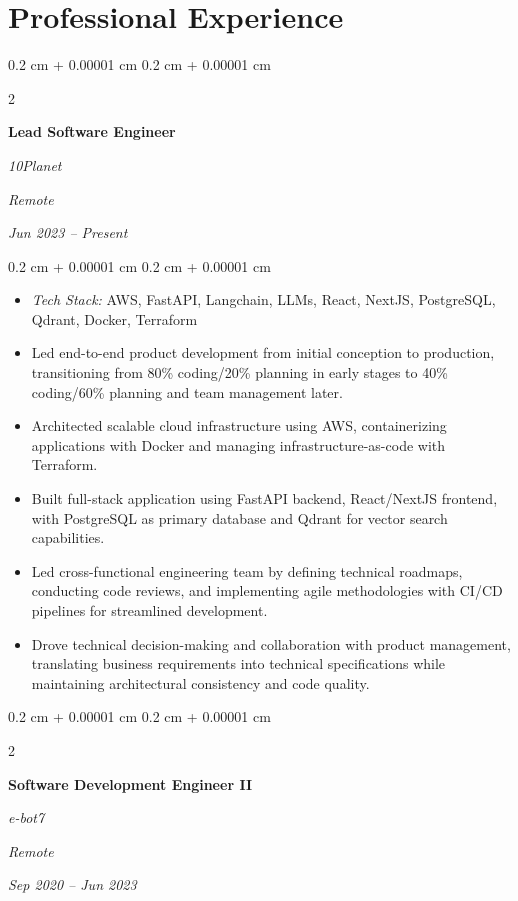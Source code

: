 \documentclass[10pt, letterpaper]{article}
\newenvironment{highlights}{
        \begin{itemize}[
            topsep=0.10 cm,
            parsep=0.10 cm,
            partopsep=0pt,
            itemsep=0pt,
            leftmargin=0.4 cm + 10pt
        ]
    }{
        \end{itemize}
    } %
\newenvironment{onecolentry}{
        \begin{adjustwidth}{
            0.2 cm + 0.00001 cm
        }{
            0.2 cm + 0.00001 cm
        }
    }{
        \end{adjustwidth}
    } %
\newenvironment{twocolentry}[2][]{
        \onecolentry
        \def\secondColumn{#2}
        \setcolumnwidth{\fill, 4.5 cm}
        \begin{paracol}{2}
    }{
        \switchcolumn \raggedleft \secondColumn
        \end{paracol}
        \endonecolentry
    } %
\begin{document}
        \section{Professional Experience}

        \begin{twocolentry}{
        \textit{Remote}    
            
        \textit{Jun 2023 – Present}}
            \textbf{Lead Software Engineer}
            
            \textit{10Planet}
        \end{twocolentry}

        \vspace{0.10 cm}
        \begin{onecolentry}
            \begin{highlights}
                \item \textit{Tech Stack:} AWS, FastAPI, Langchain, LLMs, React, NextJS, PostgreSQL, Qdrant, Docker, Terraform
                \item Led end-to-end product development from initial conception to production, transitioning from 80\% coding/20\% planning in early stages to 40\% coding/60\% planning and team management later.
                \item Architected scalable cloud infrastructure using AWS, containerizing applications with Docker and managing infrastructure-as-code with Terraform.
                \item Built full-stack application using FastAPI backend, React/NextJS frontend, with PostgreSQL as primary database and Qdrant for vector search capabilities.
                \item Led cross-functional engineering team by defining technical roadmaps, conducting code reviews, and implementing agile methodologies with CI/CD pipelines for streamlined development.
                \item Drove technical decision-making and collaboration with product management, translating business requirements into technical specifications while maintaining architectural consistency and code quality.
            \end{highlights}
        \end{onecolentry}

        \vspace{0.2 cm}

        \begin{twocolentry}{
        \textit{Remote}    
            
        \textit{Sep 2020 – Jun 2023}}
            \textbf{Software Development Engineer II}
            
            \textit{e-bot7}
        \end{twocolentry}
\end{document}
